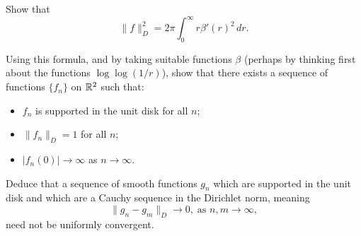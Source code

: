 \documentclass[expanded]{lkx_pset}
\begin{document}
\begin{parts}

	\begin{part}{}
		Show that
		\[
			\|f\|_{D}^{2} = 2\pi \int_{0}^{\infty} r \beta'(r)^{2}\, dr.
		\]
	\end{part}

	\begin{part}{}
		Using this formula, and by taking suitable functions $\beta$
		(perhaps by thinking first about the functions $\log\log(1/r)$),
		show that there exists a sequence of functions $\{f_{n}\}$ on
		$\mathbb{R}^{2}$ such
		that:
		\begin{itemize}
			\item $f_{n}$ is supported in the unit disk for all $n$;
			\item $\|f_{n}\|_{D} = 1$ for all $n$;
			\item $|f_{n}(0)| \to \infty$ as $n\to\infty$.
		\end{itemize}
	\end{part}

	\begin{part}{}
		Deduce that a sequence of smooth functions $g_{n}$ which are supported in
		the unit disk and which are a Cauchy sequence in the Dirichlet
		norm, meaning
		\[
			\| g_{n} - g_{m} \|_{D} \to 0, \; \text{as $n,m\to\infty$},
		\]
		need not be uniformly convergent.
	\end{part}

\end{parts}
\end{document}
